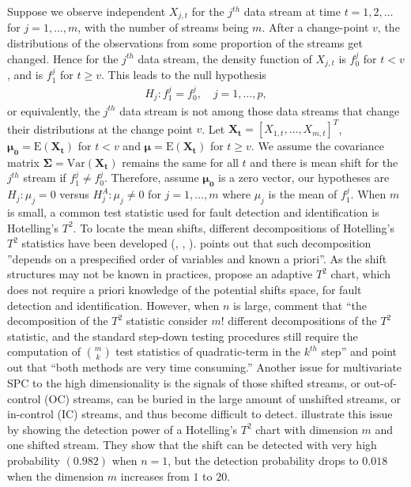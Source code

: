 \documentclass[a4paper,12pt]{article}
\newcommand{\E}{\mathrm{E}}
\newcommand{\Var}{\mathrm{Var}}
\begin{document}
Suppose we observe independent $X_{j,t}$ for the $j^{th}$ data stream at time $t = 1, 2, \ldots $ for $j = 1, \ldots, m$, with the number of streams being $m$. After a change-point $v$, the distributions of the observations from some proportion of the streams get changed. Hence for the $j^{th}$ data stream, the density function of $X_{j,t}$ is $f_0^{j}$ for $t<v$, and is $f_1^j$ for $t \ge v $. This leads to the null hypothesis 
\begin{align}
H_j: f_1^j = f_0^j,\quad j=1,\ldots,p, \label{p Hj}
\end{align}
or equivalently, the $j^{th}$ data stream is not among those data streams that change their distributions at the change point $v$. Let $\mathbf{X_t} = [X_{1,t}, \ldots, X_{m,t}]^T$, $\bm{\mu_0} = \E(\mathbf{X_t})$ for $t<v$ and $\bm{\mu} = \E(\mathbf{X_t})$ for $t\ge v$. We assume the covariance matrix $\bm{\Sigma} = \Var(\mathbf{X_t})$ remains the same for all $t$ and there is mean shift for the $j^{th}$ stream if $f_1^j \ne f_0^j$. Therefore, assume $\bm{\mu_0}$ is a zero vector, our hypotheses are $H_{j}: \mu_{j} = 0$ versus $H_{j}^A: \mu_{j} \ne 0$ for $j = 1, \ldots, m$ where $\mu_j$ is the mean of $f_1^j$. When $m$ is small, a common test statistic used for fault detection and identification is Hotelling's $T^2$. To locate the mean shifts, different decompositions of Hotelling's $T^2$ statistics have been developed (\cite{mason1995decomposition}, \cite{mason1997practical}, \cite{li2008causation}). \cite{zhu2009adaptive} points out that such decomposition ''depends on a prespecified order of variables and known a priori''. As the shift structures may not be known in practices, \cite{zhu2009adaptive} propose an adaptive $T^2$ chart, which does not require a priori knowledge of the potential shifts space, for fault detection and identification. However, when $n$ is large, \cite{li2020diagnostic} comment that 	``the decomposition of the $T^2$ statistic consider $m!$ different decompositions of the $T^2$ statistic, and the standard step-down testing procedures still require the computation of $\binom{m}{k}$ test statistics of quadratic-term in the $k^{th}$ step'' and point out that ``both methods are very time consuming.'' Another issue for multivariate SPC to the high dimensionality is the signals of those shifted streams, or out-of-control (OC) streams, can be buried in the large amount of unshifted streams, or in-control (IC) streams, and thus become difficult to detect. \cite{wang2009high} illustrate this issue by showing the detection power of a Hotelling's $T^2$ chart with dimension $m$ and one shifted stream. They show that the shift can be detected with very high probability $(0.982)$ when $n=1$, but the detection probability drops to $0.018$ when the dimension $m$ increases from $1$ to $20$.
\end{document}
